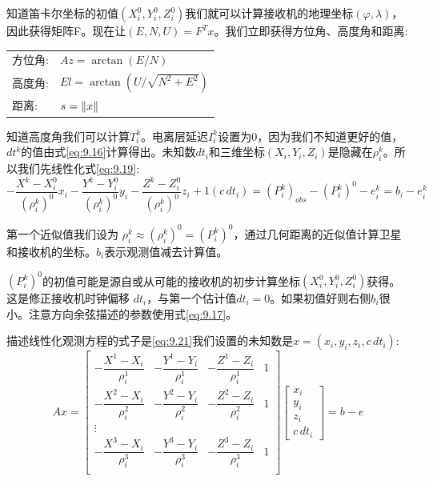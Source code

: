	知道笛卡尔坐标的初值$(X^0_i,Y^0_i,Z^0_i)$我们就可以计算接收机的地理坐标$(\varphi,\lambda)$，因此获得矩阵F。现在让$(E,N,U)=F^Tx$。我们立即获得方位角、高度角和距离:
	\begin{table}
		\begin{tabular}{ll}
			 方位角: 		 & $Az = \arctan(E/N)$ \\ 
			 高度角:		 & $El=\arctan(U/\sqrt{N^2+E^2})$ \\ 
			 距离: 		  & $s=\Arrowvert x \Arrowvert$ \\ 
		\end{tabular} 
	\end{table}
	
	知道高度角我们可以计算$T^k_i$。电离层延迟$I^k_i$设置为0，因为我们不知道更好的值，$dt^k$的值由式\ref{eq:9.16}计算得出。未知数$dt_i$和三维坐标$(X_i,Y_i,Z_i)$是隐藏在$\rho^k_i$。所以我们先线性化式\ref{eq:9.19}:
	\begin{equation}\label{eq:9.21}
	-\dfrac{X^k-X^0_i}{(\rho^k_i)^0}x_i-\dfrac{Y^k-Y^0_i}{(\rho^k_i)^0}y_i-\dfrac{Z^k-Z^0_i}{(\rho^k_i)^0}z_i+1(c\,dt_i)=(P^k_i)_{obs}-(P^k_i)^0-e^k_i=b_i-e^k_i
	\end{equation}
	
	第一个近似值我们设为 $\rho^k_i\approx(\rho^k_i)^0=(P^k_i)^0$，通过几何距离的近似值计算卫星和接收机的坐标。$b_i$表示观测值减去计算值。
	
	$(P^k_i)^0$的初值可能是源自或从可能的接收机的初步计算坐标$(X^0_i,Y^0_i,Z^0_i)$获得。这是修正接收机时钟偏移 $dt_i$，与第一个估计值$dt_i=0$。如果初值好则右侧$b_i$很小。注意方向余弦描述的参数使用式\ref{eq:9.17}。
	
	描述线性化观测方程的式子是\ref{eq:9.21}我们设置的未知数是$x=(x_i,y_i,z_i,c\,dt_i)$:
	\begin{equation}\label{eq:9.22}
	Ax=\begin{bmatrix}
	-\dfrac{X^1-X_i}{\rho^1_i} & -\dfrac{Y^1-Y_i}{\rho^1_i} & -\dfrac{Z^1-Z_i}{\rho^1_i} & 1 \\
	-\dfrac{X^2-X_i}{\rho^2_i} & -\dfrac{Y^2-Y_i}{\rho^2_i} & -\dfrac{Z^2-Z_i}{\rho^2_i} & 1 \\
	\vdots & & & \\
	-\dfrac{X^3-X_i}{\rho^3_i} & -\dfrac{Y^3-Y_i}{\rho^3_i} & -\dfrac{Z^3-Z_i}{\rho^3_i} & 1 \\
	\end{bmatrix}
	\begin{bmatrix}
	x_i \\ y_i \\ z_i \\ c\,dt_i
	\end{bmatrix}
	= b-e
	\end{equation}
	
